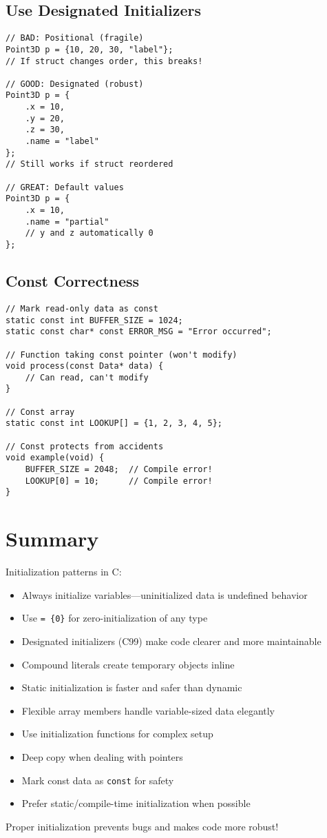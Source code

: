 \subsection{Use Designated Initializers}

\begin{lstlisting}
// BAD: Positional (fragile)
Point3D p = {10, 20, 30, "label"};
// If struct changes order, this breaks!

// GOOD: Designated (robust)
Point3D p = {
    .x = 10,
    .y = 20,
    .z = 30,
    .name = "label"
};
// Still works if struct reordered

// GREAT: Default values
Point3D p = {
    .x = 10,
    .name = "partial"
    // y and z automatically 0
};
\end{lstlisting}

\subsection{Const Correctness}

\begin{lstlisting}
// Mark read-only data as const
static const int BUFFER_SIZE = 1024;
static const char* const ERROR_MSG = "Error occurred";

// Function taking const pointer (won't modify)
void process(const Data* data) {
    // Can read, can't modify
}

// Const array
static const int LOOKUP[] = {1, 2, 3, 4, 5};

// Const protects from accidents
void example(void) {
    BUFFER_SIZE = 2048;  // Compile error!
    LOOKUP[0] = 10;      // Compile error!
}
\end{lstlisting}

\section{Summary}

Initialization patterns in C:

\begin{itemize}
    \item Always initialize variables---uninitialized data is undefined behavior
    \item Use \texttt{= \{0\}} for zero-initialization of any type
    \item Designated initializers (C99) make code clearer and more maintainable
    \item Compound literals create temporary objects inline
    \item Static initialization is faster and safer than dynamic
    \item Flexible array members handle variable-sized data elegantly
    \item Use initialization functions for complex setup
    \item Deep copy when dealing with pointers
    \item Mark const data as \texttt{const} for safety
    \item Prefer static/compile-time initialization when possible
\end{itemize}

Proper initialization prevents bugs and makes code more robust!
